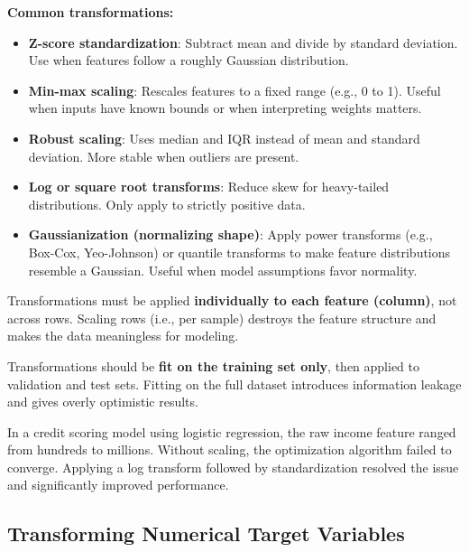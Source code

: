 \documentclass[12pt,openany, draft]{book}
\begin{document}
\textbf{Common transformations:}
\begin{itemize}
    \item \textbf{Z-score standardization}: Subtract mean and divide by standard deviation. Use when features follow a roughly Gaussian distribution.
    \item \textbf{Min-max scaling}: Rescales features to a fixed range (e.g., 0 to 1). Useful when inputs have known bounds or when interpreting weights matters.
    \item \textbf{Robust scaling}: Uses median and IQR instead of mean and standard deviation. More stable when outliers are present.
    \item \textbf{Log or square root transforms}: Reduce skew for heavy-tailed distributions. Only apply to strictly positive data.
    \item \textbf{Gaussianization (normalizing shape)}: Apply power transforms (e.g., Box-Cox, Yeo-Johnson) or quantile transforms to make feature distributions resemble a Gaussian. Useful when model assumptions favor normality.
\end{itemize}

\begin{notebox}
Transformations must be applied \textbf{individually to each feature (column)}, not across rows. Scaling rows (i.e., per sample) destroys the feature structure and makes the data meaningless for modeling. 
\end{notebox}

\begin{notebox}
Transformations should be \textbf{fit on the training set only}, then applied to validation and test sets. Fitting on the full dataset introduces information leakage and gives overly optimistic results.
\end{notebox}

\begin{examplebox}
In a credit scoring model using logistic regression, the raw income feature ranged from hundreds to millions. Without scaling, the optimization algorithm failed to converge. Applying a log transform followed by standardization resolved the issue and significantly improved performance. \mbox{}\\
\end{examplebox}


\subsection{Transforming Numerical Target Variables}
\end{document}

